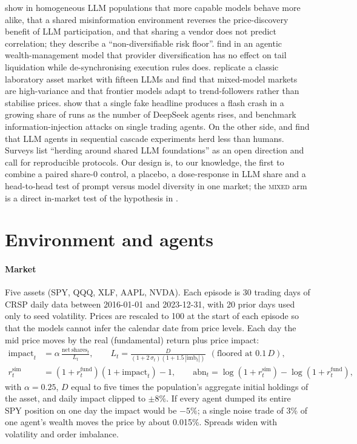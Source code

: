 \documentclass[10pt]{article}
\begin{document}
\citet{ross2026} show in homogeneous LLM populations that more capable models behave more alike, that a shared misinformation environment reverses the price-discovery benefit of LLM participation, and that sharing a vendor does not predict correlation; they describe a ``non-diversifiable risk floor''. \citet{kohli2026} find in an agentic wealth-management model that provider diversification has no effect on tail liquidation while de-synchronising execution rules does. \citet{saxena2026} replicate a classic laboratory asset market \citep{hommes2008} with fifteen LLMs and find that mixed-model markets are high-variance and that frontier models adapt to trend-followers rather than stabilise prices. \citet{sok2026} show that a single fake headline produces a flash crash in a growing share of runs as the number of DeepSeek agents rises, and \citet{wang2026fake} benchmark information-injection attacks on single trading agents. On the other side, \citet{hansen2025} and \citet{zhang2026} find that LLM agents in sequential cascade experiments herd less than humans. Surveys \citep{xia2026,scis2026} list ``herding around shared LLM foundations'' as an open direction and call for reproducible protocols. Our design is, to our knowledge, the first to combine a paired share-0 control, a placebo, a dose-response in LLM share and a head-to-head test of prompt versus model diversity in one market; the \textsc{mixed} arm is a direct in-market test of the hypothesis in \citet{ross2026}.

\section{Environment and agents}

\paragraph{Market} Five assets (SPY, QQQ, XLF, AAPL, NVDA). Each episode is 30 trading days of CRSP daily data between 2016-01-01 and 2023-12-31, with 20 prior days used only to seed volatility. Prices are rescaled to 100 at the start of each episode so that the models cannot infer the calendar date from price levels. Each day the mid price moves by the real (fundamental) return plus price impact:
\begin{align}
\mathrm{impact}_t &= \alpha\,\frac{\mathrm{net\ shares}_t}{L_t}, \qquad
L_t = \frac{D}{(1+2\,\sigma_t)(1+1.5\,|\mathrm{imb}_t|)} \ \ (\text{floored at } 0.1\,D),\\
r^{\mathrm{sim}}_t &= (1+r^{\mathrm{fund}}_t)(1+\mathrm{impact}_t)-1, \qquad
\mathrm{abn}_t = \log(1+r^{\mathrm{sim}}_t)-\log(1+r^{\mathrm{fund}}_t),
\end{align}
with $\alpha=0.25$, $D$ equal to five times the population's aggregate initial holdings of the asset, and daily impact clipped to $\pm 8\%$. If every agent dumped its entire SPY position on one day the impact would be $-5\%$; a single noise trade of 3\% of one agent's wealth moves the price by about 0.015\%. Spreads widen with volatility and order imbalance.
\end{document}
